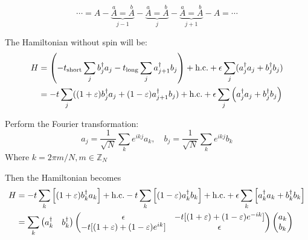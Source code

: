 \documentclass[a4paper,11pt]{article}
\begin{document}
\begin{equation*}
    \cdots =A-\underbrace{\overset{a}{A}=\overset{b}{A}}_{j-1}-\underbrace{\overset{a}{A}=\overset{b}{A}}_{j}-\underbrace{\overset{a}{A}=\overset{b}{A}}_{j+1}-A=\cdots
\end{equation*}

The Hamiltonian without spin will be:
\begin{align}
    H
    &=\left(-t_\text{short}\sum_j b_j^\dagger a_j -t_\text{long}\sum_j a_{j+1}^\dagger b_j \right)+\text{h.c.} +\epsilon\sum_{j}(a_j^\dagger a_j+b_j^\dagger b_j)\\
    &=-t\sum_{j}((1+\varepsilon)b_{j}^\dagger a_j + (1-\varepsilon)a_{j+1}^\dagger b_j) + \text{h.c.} + \epsilon\sum_j \left(a_j^\dagger a_j + b_j^\dagger b_j\right)
\end{align}

Perform the Fourier transformation:
\begin{equation}
    a_j=\frac{1}{\sqrt{N}}\sum_{k}e^{ikj}a_k,\quad 
    b_j=\frac{1}{\sqrt{N}}\sum_{k}e^{ikj}b_k
\end{equation}
Where $k=2\pi m/N, m\in\mathbb Z_N$

Then the Hamiltonian becomes
\begin{align}
    H
    &=-t\sum_{k}\left[(1+\varepsilon)b_k^\dagger a_k \right]+\text{h.c.} -t\sum_{k}\left[(1-\varepsilon)a_k^\dagger b_k\right]+\text{h.c.} +\epsilon\sum_k\left[a_k^\dagger a_k + b_k^\dagger b_k\right] \\
    &= \sum_k\begin{pmatrix}
        a_k^\dagger & b_k^\dagger
    \end{pmatrix}
    \begin{pmatrix}
        \epsilon & -t[(1+\varepsilon) + (1-\varepsilon)e^{-ik}] \\
        -t[(1+\varepsilon) + (1-\varepsilon)e^{ik}] & \epsilon
    \end{pmatrix}
    \begin{pmatrix}
        a_k\\b_k
    \end{pmatrix}
\end{align}
\end{document}
